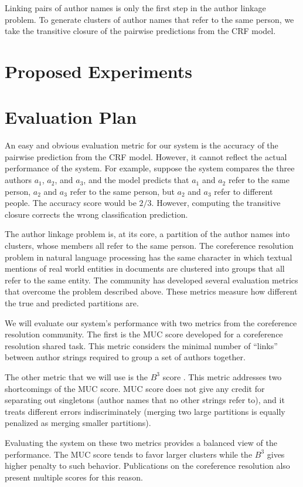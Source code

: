 \documentclass[twocolumn]{article}
\begin{document}
Linking pairs of author names is only the first step in the author
linkage problem.  To generate clusters of author names that refer to
the same person, we take the transitive closure of the pairwise
predictions from the CRF model.

\section{Proposed Experiments} %
\label{sec:proposed_experiments}


\section{Evaluation Plan} %
\label{sec:evaluation}
An easy and obvious evaluation metric for our system is the accuracy
of the pairwise prediction from the CRF model.  However, it cannot
reflect the actual performance of the system.  For example, suppose
the system compares the three authors $a_1$, $a_2$, and $a_3$, and the
model predicts that $a_1$ and $a_2$ refer to the same person, $a_2$
and $a_3$ refer to the same person, but $a_2$ and $a_3$ refer to
different people.  The accuracy score would be $2/3$.  However,
computing the transitive closure corrects the wrong classification
prediction.

The author linkage problem is, at its core, a partition of the author
names into clusters, whose members all refer to the same person.  The
coreference resolution problem in natural language processing has the
same character in which textual mentions of real world entities in
documents are clustered into groups that all refer to the same entity.
The community has developed several evaluation metrics that overcome
the problem described above.  These metrics measure how different the
true and predicted partitions are.

We will evaluate our system's performance with two metrics from the
coreference resolution community.  The first is the MUC score
\cite{Vilain95} developed for a coreference resolution shared task.
This metric considers the minimal number of ``links'' between author
strings required to group a set of authors together.

The other metric that we will use is the $B^3$ score \cite{Bagga98b}.
This metric addresses two shortcomings of the MUC score.  MUC score
does not give any credit for separating out singletons (author names
that no other strings refer to), and it treats different errors
indiscriminately (merging two large partitions is equally penalized as
merging smaller partitions).

Evaluating the system on these two metrics provides a balanced view of
the performance.  The MUC score tends to favor larger clusters while
the $B^3$ gives higher penalty to such behavior.  Publications on the
coreference resolution also present multiple scores for this reason.



\end{document}
